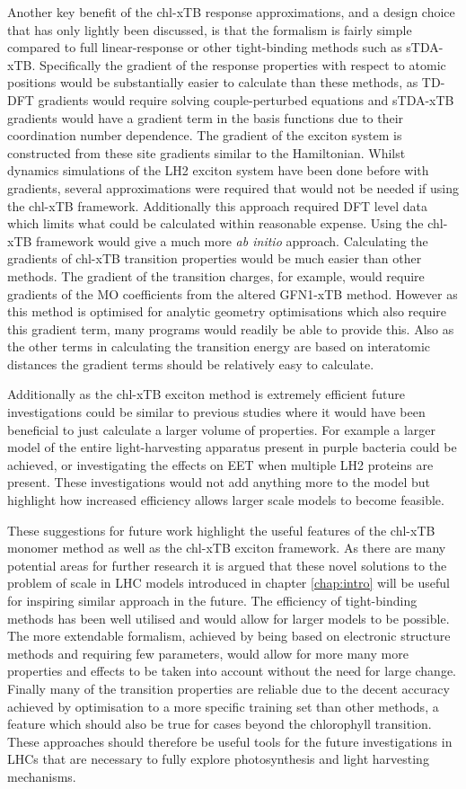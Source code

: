 Another key benefit of the chl-xTB response approximations, and a design choice 
that has only lightly been discussed, is that the formalism is fairly simple compared 
to full linear-response or other tight-binding methods such as sTDA-xTB. Specifically
the gradient of the response properties with respect to atomic positions would be
substantially easier to calculate than these methods, as TD-DFT gradients would 
require solving couple-perturbed equations and sTDA-xTB gradients would have a gradient
term in the basis functions due to their coordination number dependence. The gradient
of the exciton system is constructed from these site gradients similar to the Hamiltonian.
Whilst dynamics simulations of the LH2 exciton system have been done before with
gradients, several approximations were required that would not be needed if using
the chl-xTB framework. Additionally this approach required DFT level data which 
limits what could be calculated within reasonable expense. Using the chl-xTB framework 
would give a much more \emph{ab initio} approach. Calculating the gradients of chl-xTB
transition properties would be much easier than other methods. The gradient of the
transition charges, for example, would require gradients of the MO coefficients 
from the altered GFN1-xTB method. However as this method is optimised for analytic 
geometry optimisations which also require this gradient term, many programs would
readily be able to provide this. Also as the other terms in calculating the transition
energy are based on interatomic distances the gradient terms should be relatively 
easy to calculate.

Additionally as the chl-xTB exciton method is extremely efficient future investigations
could be similar to previous studies where it would have been beneficial to just 
calculate a larger volume of properties. For example a larger model of the entire
light-harvesting apparatus present in purple bacteria could be achieved, or investigating
the effects on EET when multiple LH2 proteins are present. These investigations 
would not add anything more to the model but highlight how increased efficiency 
allows larger scale models to become feasible.


These suggestions for future work highlight the useful features of the chl-xTB monomer
method as well as the chl-xTB exciton framework. As there are many potential areas
for further research it is argued that these novel solutions to the problem of scale
in LHC models introduced in chapter \ref{chap:intro} will be useful for inspiring
similar approach in the future. The efficiency of tight-binding methods has been
well utilised and would allow for larger models to be possible. The more extendable
formalism, achieved by being based on electronic structure methods and requiring 
few parameters, would allow for more many more properties and effects to be taken
into account without the need for large change. Finally many of the transition properties
are reliable due to the decent accuracy achieved by optimisation to a more specific
training set than other methods, a feature which should also be true for cases beyond
the \Qy chlorophyll transition. These approaches should therefore be useful tools
for the future investigations in LHCs that are necessary to fully explore photosynthesis
and light harvesting mechanisms. 